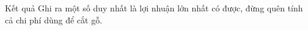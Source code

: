Kết quả
Ghi ra một số duy nhất là lợi nhuận lớn nhất có được, đừng quên tính cả chi phí dùng để cắt gỗ.